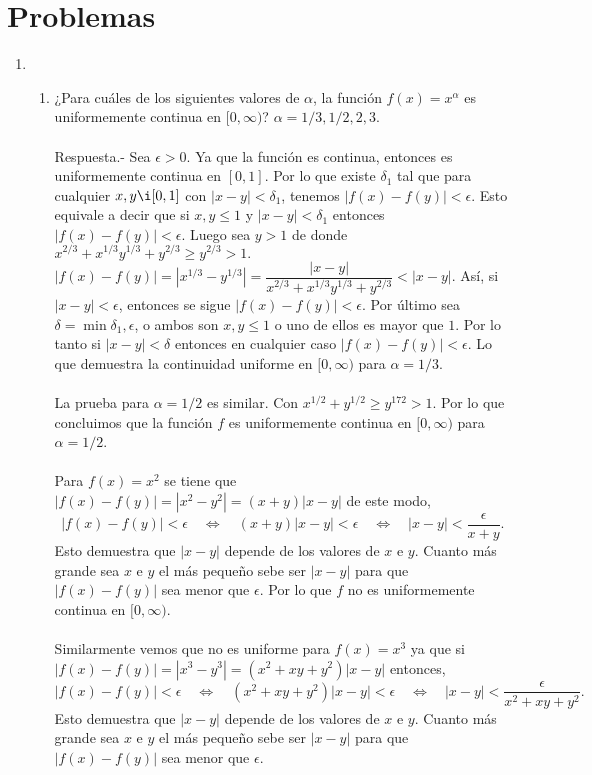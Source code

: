 \section{Problemas}

\begin{enumerate}[\bfseries 1.]

    \item 
	\begin{enumerate}[\bfseries (a)]

	    \item ¿Para cuáles de los siguientes valores de $\alpha$, la función $f(x)=x^\alpha$ es uniformemente continua en $[0,\infty)$? $\alpha=1/3,1/2,2,3$.\\\\
		Respuesta.-\; Sea $\epsilon>0$. Ya que la función es continua, entonces es uniformemente continua en $[0,1]$. Por lo que existe $\delta_1$ tal que para cualquier $x,y\i [0,1]$ con $|x-y|<\delta_1$, tenemos $|f(x)-f(y)|<\epsilon.$ Esto equivale a decir que si $x,y\leq 1$ y $|x-y|<\delta_1$ entonces $|f(x)-f(y)|<\epsilon.$ Luego sea $y>1$ de donde $x^{2/3}+x^{1/3}y^{1/3}+y^{2/3}\geq y^{2/3}>1.$\\
		$|f(x)-f(y)|=|x^{1/3}-y^{1/3}|=\dfrac{|x-y|}{x^{2/3}+x^{1/3}y^{1/3}+y^{2/3}}<|x-y|$. Así, si $|x-y|<\epsilon$, entonces se sigue $|f(x)-f(y)|<\epsilon$. Por último sea $\delta = \min{\delta_1,\epsilon}$, o ambos son $x,y\leq 1$ o uno de ellos es mayor que $1$. Por lo tanto si $|x-y|<\delta$ entonces en cualquier caso $|f(x)-f(y)|<\epsilon$. Lo que demuestra la continuidad uniforme en $[0,\infty)$ para $\alpha=1/3$.\\\\
		La prueba para $\alpha=1/2$ es similar. Con $x^{1/2}+y^{1/2}\geq y^{172}>1$. Por lo que concluimos que la función $f$ es uniformemente continua en $[0,\infty)$ para $\alpha=1/2$.\\\\
		Para $f(x)=x^2$ se tiene que $|f(x)-f(y)|=|x^2-y^2|=(x+y)|x-y|$ de este modo,
		$$|f(x)-f(y)|<\epsilon \quad \Leftrightarrow \quad (x+y)|x-y|<\epsilon \quad \Leftrightarrow \quad |x-y|<\dfrac{\epsilon}{x+y}.$$
		Esto demuestra que $|x-y|$ depende de los valores de $x$ e $y$. Cuanto más grande sea $x$ e $y$ el más pequeño sebe ser $|x-y|$ para que $|f(x)-f(y)|$ sea menor que $\epsilon.$ Por lo que $f$ no es uniformemente continua en $[0,\infty)$.\\\\
		Similarmente vemos que no es uniforme para $f(x)=x^3$ ya que si $|f(x)-f(y)|=|x^3-y^3|=(x^2+xy+y^2)|x-y|$ entonces,
		$$|f(x)-f(y)|<\epsilon \quad \Leftrightarrow \quad (x^2+xy+y^2)|x-y|<\epsilon \quad \Leftrightarrow \quad |x-y|<\dfrac{\epsilon}{x^2+xy+y^2}.$$
		Esto demuestra que $|x-y|$ depende de los valores de $x$ e $y$. Cuanto más grande sea $x$ e $y$ el más pequeño sebe ser $|x-y|$ para que $|f(x)-f(y)|$ sea menor que $\epsilon.$\\\\


\end{enumerate}
\end{enumerate}

